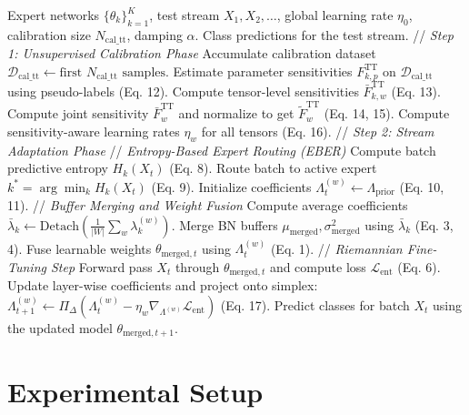 \documentclass{article}
\theoremstyle{plain}
\theoremstyle{definition}
\theoremstyle{remark}
\begin{document}
\begin{algorithm}[tb]
\caption{DR-Fisher: Robust Test-Time Model Merging}
\label{alg:dr_fisher}
\begin{algorithmic}[1]
 Expert networks $\{\theta_k\}_{k=1}^K$, test stream $X_1, X_2, \dots$, global learning rate $\eta_0$, calibration size $N_{\text{cal\_tt}}$, damping $\alpha$.
 Class predictions for the test stream.
\STATE // \textit{Step 1: Unsupervised Calibration Phase}
\STATE Accumulate calibration dataset $\mathcal{D}_{\text{cal\_tt}} \leftarrow \text{first } N_{\text{cal\_tt}} \text{ samples}$.
    \STATE Estimate parameter sensitivities $F_{k, p}^{\text{TT}}$ on $\mathcal{D}_{\text{cal\_tt}}$ using pseudo-labels (Eq. 12).
    \STATE Compute tensor-level sensitivities $\bar{F}_{k, w}^{\text{TT}}$ (Eq. 13).
\ENDFOR
\STATE Compute joint sensitivity $\bar{F}_w^{\text{TT}}$ and normalize to get $\tilde{F}_w^{\text{TT}}$ (Eq. 14, 15).
\STATE Compute sensitivity-aware learning rates $\eta_w$ for all tensors (Eq. 16).
\STATE // \textit{Step 2: Stream Adaptation Phase}
    \STATE // \textit{Entropy-Based Expert Routing (EBER)}
        \STATE Compute batch predictive entropy $H_k(X_t)$ (Eq. 8).
    \ENDFOR
    \STATE Route batch to active expert $k^* = \arg\min_k H_k(X_t)$ (Eq. 9).
    \STATE Initialize coefficients $\Lambda^{(w)}_t \leftarrow \Lambda_{\text{prior}}$ (Eq. 10, 11).
    \STATE // \textit{Buffer Merging and Weight Fusion}
    \STATE Compute average coefficients $\bar{\lambda}_k \leftarrow \text{Detach}(\frac{1}{|W|} \sum_w \lambda_{k}^{(w)})$.
    \STATE Merge BN buffers $\mu_{\text{merged}}, \sigma^2_{\text{merged}}$ using $\bar{\lambda}_k$ (Eq. 3, 4).
    \STATE Fuse learnable weights $\theta_{\text{merged}, t}$ using $\Lambda^{(w)}_t$ (Eq. 1).
    \STATE // \textit{Riemannian Fine-Tuning Step}
    \STATE Forward pass $X_t$ through $\theta_{\text{merged}, t}$ and compute loss $\mathcal{L}_{\text{ent}}$ (Eq. 6).
    \STATE Update layer-wise coefficients and project onto simplex:
    \STATE $\Lambda^{(w)}_{t+1} \leftarrow \Pi_{\Delta} \left( \Lambda^{(w)}_t - \eta_w \nabla_{\Lambda^{(w)}} \mathcal{L}_{\text{ent}} \right)$ (Eq. 17).
    \STATE Predict classes for batch $X_t$ using the updated model $\theta_{\text{merged}, t+1}$.
\ENDFOR
\end{algorithmic}
\end{algorithm}

\section{Experimental Setup}
\label{submission-experimental-setup}
\end{document}
